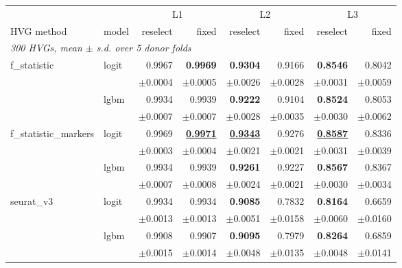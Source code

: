 \begin{table}[t]
\centering
\small
\begin{tabular}{llrrrrrr}
\toprule
 &  & \multicolumn{2}{c}{L1} & \multicolumn{2}{c}{L2} & \multicolumn{2}{c}{L3} \\
\cmidrule(lr){3-4}\cmidrule(lr){5-6}\cmidrule(lr){7-8}
HVG method & model & reselect & fixed & reselect & fixed & reselect & fixed \\
\midrule
\multicolumn{8}{l}{\emph{300 HVGs, mean $\pm$ s.d. over 5 donor folds}} \\
f\_statistic & logit & 0.9967 & \textbf{0.9969} & \textbf{0.9304} & 0.9166 & \textbf{0.8546} & 0.8042 \\
 &  & {\scriptsize$\pm$0.0004} & {\scriptsize$\pm$0.0005} & {\scriptsize$\pm$0.0026} & {\scriptsize$\pm$0.0028} & {\scriptsize$\pm$0.0031} & {\scriptsize$\pm$0.0059} \\[1pt]
 & lgbm & 0.9934 & 0.9939 & \textbf{0.9222} & 0.9104 & \textbf{0.8524} & 0.8053 \\
 &  & {\scriptsize$\pm$0.0007} & {\scriptsize$\pm$0.0007} & {\scriptsize$\pm$0.0028} & {\scriptsize$\pm$0.0035} & {\scriptsize$\pm$0.0030} & {\scriptsize$\pm$0.0062} \\[1pt]
\addlinespace
f\_statistic\_markers & logit & 0.9969 & \underline{\textbf{0.9971}} & \underline{\textbf{0.9343}} & 0.9276 & \underline{\textbf{0.8587}} & 0.8336 \\
 &  & {\scriptsize$\pm$0.0003} & {\scriptsize$\pm$0.0004} & {\scriptsize$\pm$0.0021} & {\scriptsize$\pm$0.0021} & {\scriptsize$\pm$0.0031} & {\scriptsize$\pm$0.0039} \\[1pt]
 & lgbm & 0.9934 & 0.9939 & \textbf{0.9261} & 0.9227 & \textbf{0.8567} & 0.8367 \\
 &  & {\scriptsize$\pm$0.0007} & {\scriptsize$\pm$0.0008} & {\scriptsize$\pm$0.0024} & {\scriptsize$\pm$0.0021} & {\scriptsize$\pm$0.0030} & {\scriptsize$\pm$0.0034} \\[1pt]
\addlinespace
seurat\_v3 & logit & 0.9934 & 0.9934 & \textbf{0.9085} & 0.7832 & \textbf{0.8164} & 0.6659 \\
 &  & {\scriptsize$\pm$0.0013} & {\scriptsize$\pm$0.0013} & {\scriptsize$\pm$0.0051} & {\scriptsize$\pm$0.0158} & {\scriptsize$\pm$0.0060} & {\scriptsize$\pm$0.0160} \\[1pt]
 & lgbm & 0.9908 & 0.9907 & \textbf{0.9095} & 0.7979 & \textbf{0.8264} & 0.6859 \\
 &  & {\scriptsize$\pm$0.0015} & {\scriptsize$\pm$0.0014} & {\scriptsize$\pm$0.0048} & {\scriptsize$\pm$0.0135} & {\scriptsize$\pm$0.0048} & {\scriptsize$\pm$0.0141} \\[1pt]

\end{tabular}
\end{table}
